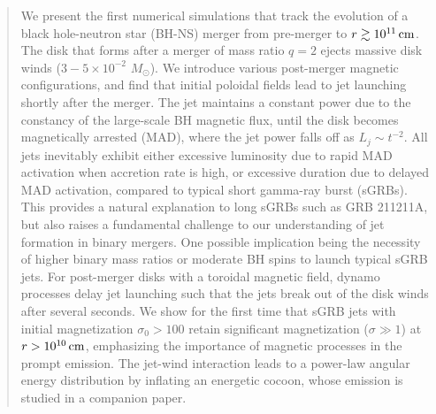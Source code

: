 \documentclass[twocolumn,dvipsnames]{aastex62}
\newcommand{\msun}{\,{M_{\odot}}}
\begin{document}
    \author[0000-0002-0050-1783]{Matthew D. Duez}

    \author[0000-0001-5392-7342]{Lawrence E. Kidder}

    \author[0000-0001-9288-519X]{Harald P. Pfeiffer}

    \author[0000-0001-6656-9134]{Mark A. Scheel}

\def\thefootnote{*}

\begin{abstract}

We present the first numerical simulations that track the evolution of a black hole-neutron star (BH-NS) merger from pre-merger to $r\gtrsim10^{11}\,{\rm cm}$. The disk that forms after a merger of mass ratio $q=2$ ejects massive disk winds ($3-5\times10^{-2}\,\msun$). We introduce various post-merger magnetic configurations, and find that initial poloidal fields lead to jet launching shortly after the merger. The jet maintains a constant power due to the constancy of the large-scale BH magnetic flux, until the disk becomes magnetically arrested (MAD), where the jet power falls off as $L_j\sim t^{-2}$. All jets inevitably exhibit either excessive luminosity due to rapid MAD activation when accretion rate is high, or excessive duration due to delayed MAD activation, compared to typical short gamma-ray burst (sGRBs). This provides a natural explanation to long sGRBs such as GRB 211211A, but also raises a fundamental challenge to our understanding of jet formation in binary mergers. One possible implication being the necessity of higher binary mass ratios or moderate BH spins to launch typical sGRB jets. For post-merger disks with a toroidal magnetic field, dynamo processes delay jet launching such that the jets break out of the disk winds after several seconds. We show for the first time that sGRB jets with initial magnetization $\sigma_0>100$ retain significant magnetization ($\sigma\gg1$) at $r>10^{10}\,{\rm cm}$, emphasizing the importance of magnetic processes in the prompt emission. The jet-wind interaction leads to a power-law angular energy distribution by inflating an energetic cocoon, whose emission is studied in a companion paper.

\end{abstract}
	
\end{document}
